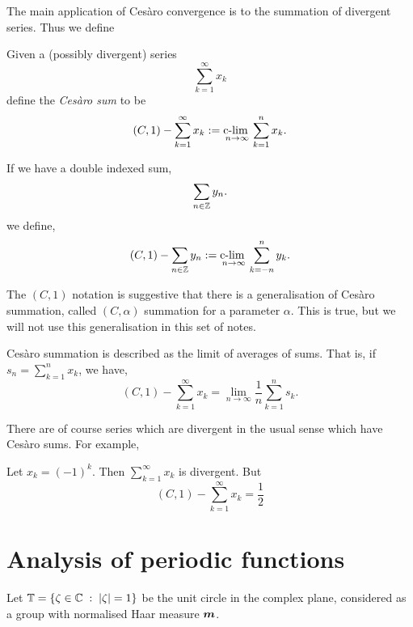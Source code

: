 \documentclass{owmaths}
\begin{document}
The main application of Ces\`aro convergence is to the summation
of divergent series. Thus we define
\begin{definition}
    Given a (possibly divergent) series
    \begin{equation*}
        \sum_{k=1}^\infty x_k
    \end{equation*}
    define the \emph{Ces\`aro sum} to be
    \begin{equation*}
        (C,1)-\sum_{k=1}^\infty x_k := \underset{n\rightarrow\infty}{\operatorname{c-lim}\;} \sum_{k=1}^n x_k.
    \end{equation*}
    
    If we have a double indexed sum, 
    \begin{equation*}
        \sum_{n \in \mathbb{Z}} y_n.
    \end{equation*}
    we define,
    \begin{equation*}
        (C,1)-\sum_{n \in \mathbb{Z}} y_n := \underset{n\rightarrow\infty} {\operatorname{c-lim}\;} \sum_{k=-n}^n y_k.
    \end{equation*}
\end{definition}
The $(C,1)$ notation is suggestive that there is a generalisation of Ces\`aro
summation, called $(C,\alpha)$ summation for a parameter $\alpha$. This
is true, but we will not use this generalisation in this set of notes.

Ces\`aro summation is described as the limit of averages of sums. That is, if
$s_n = \sum_{k=1}^n x_k$, we have, 
\begin{equation*}
    (C,1)-\sum_{k=1}^\infty x_k = \lim_{n\rightarrow\infty} \frac{1}{n}\sum_{k=1}^n s_k.
\end{equation*}

There are of course series which are divergent in the usual sense which have 
Ces\`aro sums. For example,
\begin{example}
    Let $x_k = (-1)^k$. Then $\sum_{k=1}^\infty x_k$ is divergent. But
    \begin{equation*}
        (C,1)-\sum_{k=1}^\infty x_k = \frac{1}{2}
    \end{equation*}
\end{example}

\section{Analysis of periodic functions}
Let $\mathbb{T} = \{ \zeta\in \mathbb{C}\;:\;|\zeta| = 1\}$ be the unit
circle in the complex plane, considered as a group
with normalised Haar measure $\boldsymbol{m}$. 
\end{document}
